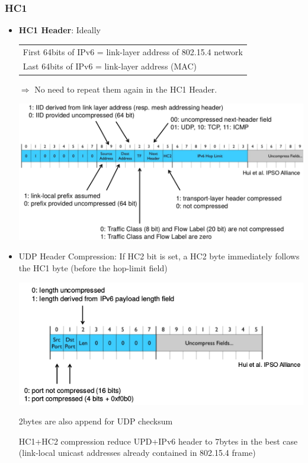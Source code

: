 \subsubsection{HC1}
\begin{itemize}
    \item \textbf{HC1 Header}: Ideally \begin{tabular}{l}
            First 64bits of IPv6 = link-layer address of 802.15.4 network\\
            Last 64bits of IPv6 = link-layer address (MAC)
        \end{tabular}

        $\Rightarrow$ No need to repeat them again in the HC1
        Header.

        \begin{center}
            \includegraphics[width=0.9\linewidth]{img/HC1.png}
        \end{center}

    \item UDP Header Compression: If HC2 bit is set, a HC2 byte
        immediately follows the HC1 byte (before the hop-limit field)
        \begin{center}
            \includegraphics[width=0.7\linewidth]{img/UDP.png}
        \end{center}

        2bytes are also append for UDP checksum

        \proitem{} HC1+HC2 compression reduce UPD+IPv6 header to
        7bytes in the best case (link-local unicast addresses already
        contained in 802.15.4 frame)


\end{itemize}
